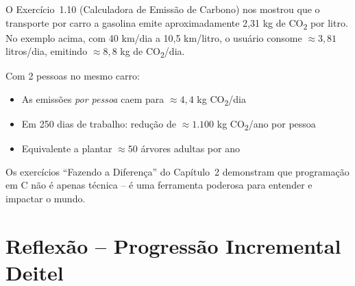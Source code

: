 \documentclass[12pt,a4paper]{article}
\begin{document}
\begin{tcolorbox}[colback=ecolightgreen,colframe=ecogreen,
  title={\bfseries Benefícios Ambientais do Transporte Solidário}]

O Exercício~1.10 (Calculadora de Emissão de Carbono) nos mostrou que o
transporte por carro a gasolina emite aproximadamente 2,31 kg de CO\textsubscript{2}
por litro. No exemplo acima, com 40 km/dia a 10,5 km/litro, o usuário consome
$\approx 3,81$ litros/dia, emitindo $\approx 8,8$ kg de CO\textsubscript{2}/dia.

Com 2 pessoas no mesmo carro:
\begin{itemize}
  \item As emissões \textit{por pessoa} caem para $\approx 4,4$ kg CO\textsubscript{2}/dia
  \item Em 250 dias de trabalho: redução de $\approx 1.100$ kg CO\textsubscript{2}/ano por pessoa
  \item Equivalente a plantar $\approx 50$ árvores adultas por ano
\end{itemize}

Os exercícios ``Fazendo a Diferença'' do Capítulo~2 demonstram que programação
em C não é apenas técnica -- é uma ferramenta poderosa para entender e impactar o mundo.
\end{tcolorbox}

\newpage

\section*{Reflexão -- Progressão Incremental Deitel}
\end{document}
